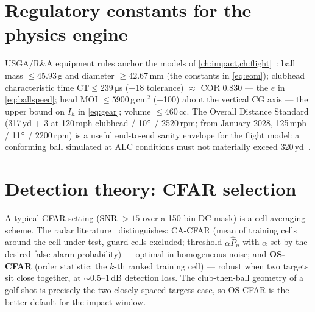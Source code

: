 \section{Regulatory constants for the physics engine}

USGA/R\&A equipment rules anchor the models of
\cref{ch:impact,ch:flight}~\cite{usgarules}: ball mass
$\le45.93$\,g and diameter $\ge42.67$\,mm (the constants in
\cref{eq:eom}); clubhead characteristic time
$\mathrm{CT}\le239$\,\si{\micro\second} (+18 tolerance)
$\approx$ COR 0.830 --- the $e$ in \cref{eq:ballspeed}; head MOI
$\le5900$\,g\,cm$^2$ (+100) about the vertical CG axis --- the upper
bound on $I_h$ in \cref{eq:gear}; volume $\le460$\,cc. The Overall
Distance Standard (317\,yd + 3 at 120\,mph clubhead / 10$\si{\degree}$ /
2520\,rpm; from January 2028, 125\,mph / 11$\si{\degree}$ / 2200\,rpm) is a
useful end-to-end sanity envelope for the flight model: a conforming
ball simulated at ALC conditions must not materially exceed
320\,yd~\cite{usgarules}.

\section{Detection theory: CFAR selection}

A typical CFAR setting (SNR $>15$ over a 150-bin DC mask) is a
cell-averaging scheme. The radar literature~\cite{cfartutorial}
distinguishes: CA-CFAR (mean of training cells around the cell under
test, guard cells excluded; threshold $\alpha\hat P_n$ with $\alpha$
set by the desired false-alarm probability) --- optimal in homogeneous
noise; and \textbf{OS-CFAR} (order statistic: the $k$-th ranked
training cell) --- robust when two targets sit close together, at
$\sim$0.5--1\,dB detection loss. The club-then-ball geometry of a golf
shot is precisely the two-closely-spaced-targets case, so OS-CFAR is
the better default for the impact window.
